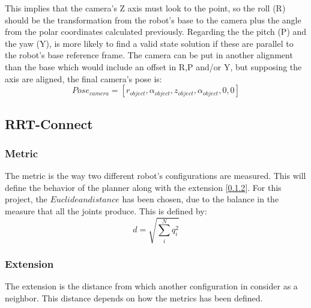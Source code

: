 	This implies that the camera's Z axis must look to the point, so the roll (R) should be the transformation from the robot's base to the camera plus the angle from the polar coordinates calculated previously.
	Regarding the the pitch (P) and the yaw (Y), is more likely to find a valid state solution if these are parallel to the robot's base reference frame. 
	The camera can be put in another alignment than the base which would include an offset in R,P and/or Y, but supposing the axis are aligned, the final camera's pose is:
		\begin{equation}
			\label{eq:cameras_pose}
			Pose_{camera} = [r_{object},\alpha_{object},z_{object},\alpha_{object},0,0]
		\end{equation}

	\subsection{RRT-Connect} %
	\label{sub:rrt_connect_implementation}
	\subsubsection{Metric} %
	\label{sub:metric}
	The metric is the way two different robot's configurations are measured. This will define the behavior of the planner along with the extension [\ref{sub:extension}]. For this project, the $Euclidean distance$ has been chosen, due to the balance in the measure that all the joints produce. This is defined by:
	\begin{equation}
		d=\sqrt{\sum_i^N q_i^2}
	\end{equation}

	\subsubsection{Extension} %
	\label{sub:extension}
	The extension is the distance from which another configuration in consider as a neighbor. This distance depends on how the metrics has been defined.

